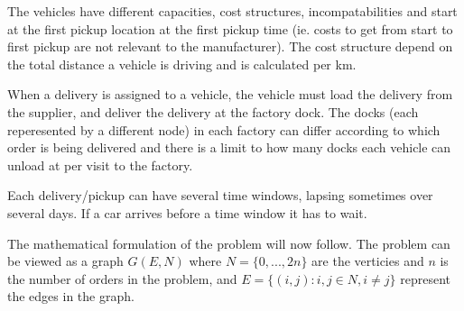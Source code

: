 \documentclass[a4paper,10pt]{article}
\begin{document}
The vehicles have different capacities, cost structures, incompatabilities and start at the first pickup location at the first pickup time (ie. costs to get from start to first pickup are not relevant to the manufacturer).
The cost structure depend on the total distance a vehicle is driving and is calculated per km. \par
When a delivery is assigned to a vehicle, the vehicle must load the delivery from the supplier, and deliver the delivery at the factory dock.
The docks (each reperesented by a different node) in each factory can differ according to which order is being delivered and there is a limit to how many docks each vehicle can unload at per visit to the factory. \par
Each delivery/pickup can have several time windows, lapsing sometimes over several days. If a car arrives before a time window it has to wait. \par
The mathematical formulation of the problem will now follow. 
The problem can be viewed as a graph $G(E,N)$ where $N=\{0,...,2n\}$ are the verticies and $n$ is the number of orders in the problem, and $E=\{(i,j): i,j \in N, i \neq j\}$ represent the edges in the graph.
\linebreak
\end{document}
